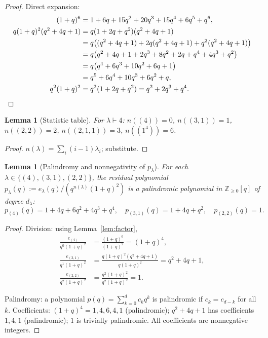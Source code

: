 \documentclass[11pt]{article}
\newtheorem{lemma}[theorem]{Lemma}
\theoremstyle{definition}
\begin{document}
\begin{proof}
Direct expansion:
\begin{align*}
(1+q)^6 &= 1 + 6q + 15q^2 + 20q^3 + 15q^4 + 6q^5 + q^6,\\
q(1+q)^2 (q^2 + 4q + 1) &= q(1 + 2q + q^2)(q^2 + 4q + 1)\\
&= q\bigl((q^2+4q+1) + 2q(q^2+4q+1) + q^2(q^2+4q+1)\bigr)\\
&= q\bigl(q^2+4q+1 + 2q^3+8q^2+2q + q^4+4q^3+q^2\bigr)\\
&= q\bigl(q^4 + 6q^3 + 10q^2 + 6q + 1\bigr)\\
&= q^5 + 6q^4 + 10q^3 + 6q^2 + q,\\
q^2 (1+q)^2 &= q^2 (1 + 2q + q^2) = q^2 + 2q^3 + q^4.\qedhere
\end{align*}
\end{proof}

\begin{lemma}[Statistic table]\label{lem:nlambda}
For $\lambda \vdash 4$: $n((4))=0$, $n((3,1))=1$, $n((2,2))=2$,
$n((2,1,1))=3$, $n((1^4))=6$.
\end{lemma}

\begin{proof}
$n(\lambda)=\sum_i (i-1)\lambda_i$; substitute.
\end{proof}

\begin{lemma}[Palindromy and nonnegativity of $p_\lambda$]\label{lem:pallnn}
For each $\lambda \in \{(4),(3,1),(2,2)\}$, the residual polynomial
$p_\lambda(q) := e_\lambda(q)/(q^{n(\lambda)}(1+q)^2)$ is a palindromic
polynomial in $\mathbb{Z}_{\geq 0}[q]$ of degree $d_\lambda$:
\[
p_{(4)}(q) = 1+4q+6q^2+4q^3+q^4, \quad
p_{(3,1)}(q) = 1+4q+q^2, \quad
p_{(2,2)}(q) = 1.
\]
\end{lemma}

\begin{proof}
Division: using Lemma~\ref{lem:factor},
\begin{align*}
\frac{e_{(4)}}{q^0(1+q)^2} &= \frac{(1+q)^6}{(1+q)^2} = (1+q)^4,\\
\frac{e_{(3,1)}}{q^1(1+q)^2} &= \frac{q(1+q)^2(q^2+4q+1)}{q(1+q)^2} = q^2+4q+1,\\
\frac{e_{(2,2)}}{q^2(1+q)^2} &= \frac{q^2(1+q)^2}{q^2(1+q)^2} = 1.
\end{align*}

Palindromy: a polynomial $p(q) = \sum_{k=0}^{d} c_k q^k$ is palindromic if
$c_k = c_{d-k}$ for all $k$. Coefficients:
$(1+q)^4 = 1,4,6,4,1$ (palindromic);
$q^2+4q+1$ has coefficients $1,4,1$ (palindromic);
$1$ is trivially palindromic. All coefficients are nonnegative integers.
\end{proof}
\end{document}
